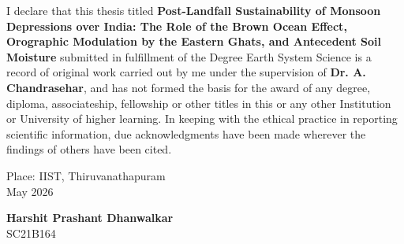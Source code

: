 \begin{declaration}
  \noindent  I declare that this thesis titled {\bf
    Post-Landfall Sustainability of Monsoon Depressions over India: The
    Role of the Brown Ocean Effect, Orographic Modulation by the
  Eastern Ghats, and Antecedent Soil Moisture} submitted in
  fulfillment of the Degree Earth System Science is a record of
  original work carried out by me under the supervision of {\bf Dr.
  A. Chandrasehar}, and has not formed the basis for the award of any
  degree, diploma, associateship, fellowship or other titles in this
  or any other Institution or University of higher learning. In
  keeping with the ethical practice in reporting scientific
  information, due acknowledgments have been made wherever the
  findings of others have been cited.

  \vspace*{1in}

  \noindent
  \begin{minipage}{\textwidth}
    \begin{minipage}{0.49\linewidth}
      \begin{flushleft}
        Place: IIST, Thiruvanathapuram\\
        May 2026
      \end{flushleft}
    \end{minipage}
    \hfill
    \begin{minipage}{0.49\linewidth}
      \begin{flushright}
        {\bf Harshit Prashant Dhanwalkar} \\
        SC21B164
      \end{flushright}
    \end{minipage}
  \end{minipage}

\end{declaration}
